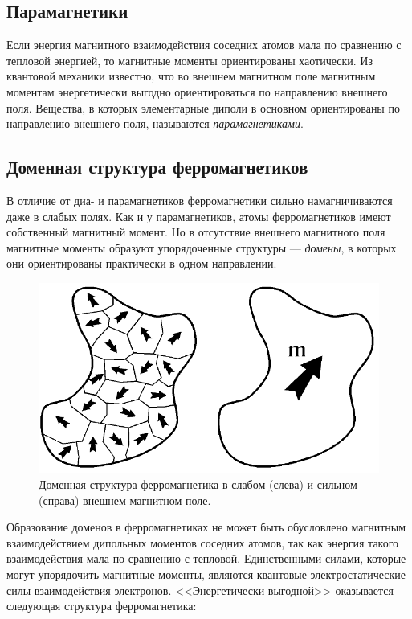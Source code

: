 \subsection*{Парамагнетики}

Если энергия магнитного взаимодействия соседних атомов мала по сравнению с тепловой энергией, то магнитные моменты ориентированы хаотически. Из квантовой механики известно, что во внешнем магнитном поле магнитным моментам энергетически выгодно ориентироваться по направлению внешнего поля. Вещества, в которых элементарные диполи в основном ориентированы по направлению внешнего поля, называются \textit{парамагнетиками}.

\subsection*{Доменная структура ферромагнетиков}

В отличие от диа- и парамагнетиков ферромагнетики сильно намагничиваются даже в слабых полях. Как и у парамагнетиков, атомы ферромагнетиков имеют собственный магнитный момент. Но в отсутствие внешнего магнитного поля магнитные моменты образуют упорядоченные структуры --- \textit{домены}, в которых они ориентированы практически в одном направлении.

\begin{figure}
	\vspace{-10pt}
	\centering
	\includegraphics[width=0.70\linewidth]{../res/domens.png}
	\caption{Доменная структура ферромагнетика в слабом (слева) и сильном (справа) внешнем магнитном поле.}
	\label{img:domen}
\end{figure}

Образование доменов в ферромагнетиках не может быть обусловлено магнитным взаимодействием дипольных моментов соседних атомов, так как энергия такого взаимодействия мала по сравнению с тепловой. Единственными силами, которые могут упорядочить магнитные моменты, являются квантовые электростатические силы взаимодействия электронов. <<Энергетически выгодной>> оказывается следующая структура ферромагнетика:

